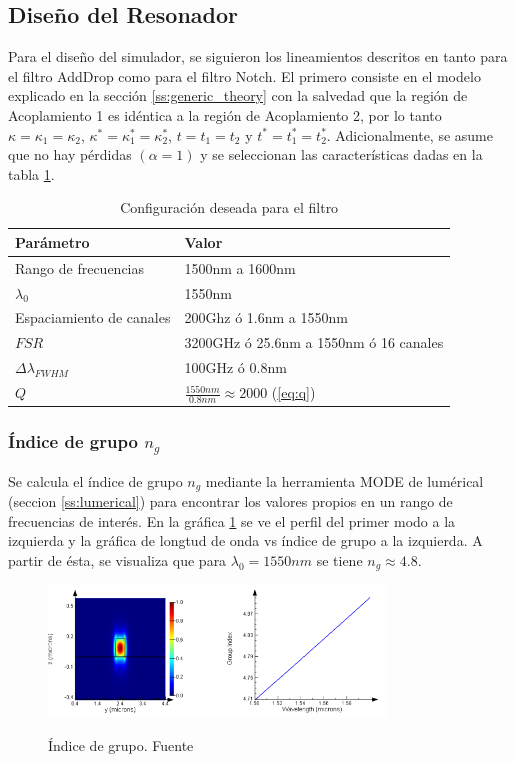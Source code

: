\subsection{Diseño del Resonador}
\label{sss:rr_design}

Para el diseño del simulador, se siguieron los lineamientos descritos en \cite{Lumerical2009}
tanto para el filtro AddDrop como para el filtro Notch. El primero consiste en
el modelo explicado en la sección \ref{ss:generic_theory} con la salvedad que 
la región de Acoplamiento 1 es idéntica a la región de Acoplamiento 2, por lo tanto
$\kappa = \kappa_1 = \kappa_2$, 
$\kappa^* = \kappa_1^* = \kappa_2^*$, 
$t=t_1 = t_2$ y 
$t^*=t_1^* = t_2^*$. 
Adicionalmente, se asume que no hay pérdidas $(\alpha=1)$ y
se seleccionan las características dadas en la tabla \ref{tb:lum_params}.

\begin{table}
\centering
\begin{tabular}{|l|l|}
\hline
Parámetro & Valor \\
\hline
Rango de frecuencias & 1500nm a 1600nm \\ 
$\lambda_0$ & 1550nm \\
Espaciamiento de canales & 200Ghz ó 1.6nm a 1550nm \\
$FSR$ & 3200GHz ó 25.6nm a 1550nm ó 16 canales \\
$\Delta \lambda_{FWHM}$ & 100GHz ó 0.8nm \\
$Q$ & $\frac{1550nm}{0.8nm} \approx 2000$  (\ref{eq:q})\\
\hline
\end{tabular}
\caption{Configuración deseada para el filtro}
\label{tb:lum_params}
\end{table} 

\subsubsection{Índice de grupo $n_g$}

Se calcula el índice de grupo $n_g$ mediante la herramienta MODE de lumérical
(seccion \ref{ss:lumerical}) para encontrar los valores propios en un rango de 
frecuencias de interés. En la gráfica \ref{fig:ng} se
ve el perfil del primer modo a la izquierda y la gráfica de longtud de onda
vs índice de grupo a la izquierda. A partir de ésta, se visualiza que para
$\lambda_0=1550nm$ se tiene $n_g\approx4.8$.

\begin{figure}[h!]
\caption{Índice de grupo. Fuente\cite{Lumerical2009}}
\centering
\includegraphics[width=0.8\textwidth,natwidth=652,natheight=254]{figs/ng.png}
\label{fig:ng}
\end{figure} 

